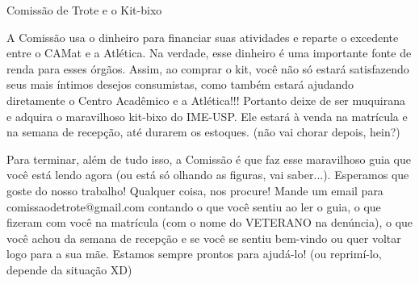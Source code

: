 \begin{secao}{Comissão de Trote e o Kit-bixo}
\begin{enumerate}
\end{enumerate}
A Comissão usa o dinheiro para financiar suas atividades e reparte o excedente
entre o CAMat e a Atlética. Na verdade, esse dinheiro é uma importante fonte de
renda para esses órgãos. Assim, ao comprar o kit, você não só estará
satisfazendo seus mais íntimos desejos consumistas, como também estará ajudando
diretamente o Centro Acadêmico e a Atlética!!! Portanto deixe de ser muquirana e
adquira o maravilhoso kit-bixo do IME-USP. Ele estará à venda na matrícula e na
semana de recepção, até durarem os estoques. (não vai chorar depois, hein?)


Para terminar, além de tudo isso, a Comissão é que faz esse maravilhoso guia que
você está lendo agora (ou está só olhando as figuras, vai saber...). Esperamos que
goste do nosso trabalho! Qualquer coisa, nos procure! Mande um email para comissaodetrote@gmail.com contando o que você sentiu 
ao ler o guia, o que fizeram com você na matrícula (com o nome do VETERANO na denúncia),
o que você achou da semana de recepção e se você se sentiu bem-vindo ou quer voltar logo
para a sua mãe. Estamos sempre prontos para ajudá-lo! (ou reprimí-lo, depende da situação XD) 

\end{secao}
